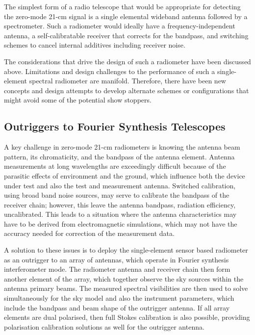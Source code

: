   The simplest form of a radio telescope that would be appropriate for detecting the zero-mode 21-cm signal is a single elemental wideband antenna followed by a spectrometer.  Such a radiometer would ideally have a frequency-independent antenna, a self-calibratable receiver that corrects for the bandpass, and switching schemes to cancel internal additives including receiver noise.
  
  The considerations that drive the design of such a radiometer have been discussed above.  Limitations and design challenges to the performance of such a single-element spectral radiometer are manifold.  Therefore, there have been new concepts and design attempts to develop alternate schemes or configurations that might avoid some of the potential show stoppers.
  
\subsection{Outriggers to Fourier Synthesis Telescopes}
  
  A key challenge in zero-mode 21-cm radiometers is knowing the antenna beam pattern, its chromaticity, and the bandpass of the antenna element.  Antenna measurements at long wavelengths are exceedingly difficult because of the parasitic effects of environment and the ground, which influence both the device under test and also the test and measurement antenna.  Switched calibration, using broad band noise sources, may serve to calibrate the bandpass of the receiver chain; however, this leave the antenna bandpass, radiation efficiency, uncalibrated.  This leads to a situation where the antenna characteristics may have to be derived from electromagnetic simulations, which may not have the accuracy needed for correction of the measurement data.
  
  A solution to these issues is to deploy the single-element sensor based radiometer as an outrigger to an array of antennas, which operate in Fourier synthesis interferometer mode.  The radiometer antenna and receiver chain then form another element of the array, which together observe the sky sources within the antenna primary beams.  The measured spectral visibilities are then used to solve simultaneously for the sky model and also the instrument parameters, which include the bandpass and beam shape of the outrigger antenna. If all array elements are dual polarised, then full Stokes calibration is also possible, providing polarisation calibration solutions as well for the outrigger antenna.
  
